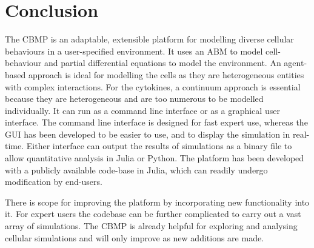 \documentclass[12pt]{article}
\begin{document}
\section{Conclusion}
The CBMP is an adaptable, extensible platform for modelling diverse cellular behaviours in a user-specified 
environment. It uses an ABM to model cell-behaviour and partial differential equations to model the environment. 
An agent-based approach is ideal for modelling the cells as they are heterogeneous entities with complex 
interactions. For the cytokines, a continuum approach is essential because they are heterogeneous and 
are too numerous to be modelled individually. It can run as a command line interface or as a graphical 
user interface. The command line interface is designed for fast expert use, whereas the GUI has been 
developed to be easier to use, and to display the simulation in real-time. Either interface can output 
the results of simulations as a binary file to allow quantitative analysis in Julia or Python. The platform 
has been developed with a publicly available code-base in Julia, which can readily undergo modification 
by end-users.

There is scope for improving the platform by incorporating new functionality into it. For expert users 
the codebase can be further complicated to carry out a vast array of simulations. The CBMP is already 
helpful for exploring and analysing cellular simulations and will only improve as new additions are made. 

\newpage
\end{document}
